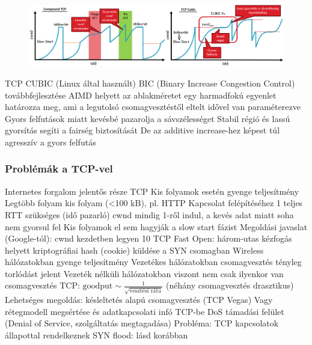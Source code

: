 \documentclass[12pt,a4paper]{article}
\begin{document}
\begin{figure}[h!]
	\centering
	\includegraphics[width=1\linewidth]{"TCP-Compound-Cubic"}
\end{figure}

\begin{outline}
	\1 TCP CUBIC (Linux által használt)
		\2 BIC (Binary Increase Congestion Control) továbbfejlesztése
		\2 AIMD helyett az ablakméretet egy harmadfokú egyenlet határozza meg, ami a legutolsó csomagvesztéstől eltelt idővel van paraméterezve
		\2 Gyors felfutások miatt kevésbé pazarolja a sávszélességet
		\2 Stabil régió és lassú gyorsítás segíti a fairség biztosítását
			\3 De az additive increase-hez képest túl agresszív a gyors felfutás
\end{outline}

\pagebreak

\subsubsection{Problémák a TCP-vel}

\begin{outline}
	\1 Internetes forgalom jelentős része TCP
	\1 Kis folyamok esetén gyenge teljesítmény
		\2 Legtöbb folyam kis folyam (<100 kB), pl. HTTP
		\2 Kapcsolat felépítéséhez 1 teljes RTT szükséges (idő pazarló)
		\2 cwnd mindig 1-ről indul, a kevés adat miatt soha nem gyorsul fel
		\2 Kis folyamok el sem hagyják a slow start fázist
		\2 Megoldási javaslat (Google-tól):
			\3 cwnd kezdetben legyen 10
			\3 TCP Fast Open: három-utas kézfogás helyett kriptográfiai hash (cookie) küldése a SYN csomagban
	\1 Wireless hálózatokban gyenge teljesítmény
		\2 Vezetékes hálózatokban csomagvesztés tényleg torlódást jelent
		\2 Vezeték nélküli hálózatokban viszont nem csak ilyenkor van csomagvesztés
		\2 TCP: $\text{goodput} \sim \frac{1}{\sqrt{\text{vesztési ráta}}}$ (néhány csomagvesztés drasztikus)
		\2 Lehetséges megoldás: késleltetés alapú csomagvesztés (TCP Vegas)
		\2 Vagy rétegmodell megsértése és adatkapcsolati infó TCP-be
	\1 DoS támadási felület (Denial of Service, szolgáltatás megtagadása)
		\2 Probléma: TCP kapcsolatok állapottal rendelkeznek
		\2 SYN flood: lásd korábban
\end{outline}
\end{document}
